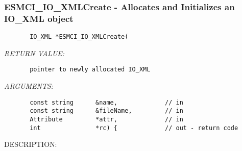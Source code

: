  
\setlength{\oldparskip}{\parskip}
\setlength{\parskip}{1.5ex}
\setlength{\oldparindent}{\parindent}
\setlength{\parindent}{0pt}
\setlength{\oldbaselineskip}{\baselineskip}
\setlength{\baselineskip}{11pt}
 
\def\bv{\begin{verbatim}}
\def\ev{\end{verbatim}}
\def\be{\begin{equation}}
\def\ee{\end{equation}}
\def\bea{\begin{eqnarray}}
\def\eea{\end{eqnarray}}
\def\bi{\begin{itemize}}
\def\ei{\end{itemize}}
\def\bn{\begin{enumerate}}
\def\en{\end{enumerate}}
\def\bd{\begin{description}}
\def\ed{\end{description}}
\def\({\left (}
\def\){\right )}
\def\[{\left [}
\def\]{\right ]}
\def\<{\left  \langle}
\def\>{\right \rangle}
\def\cI{{\cal I}}
\def\diag{\mathop{\rm diag}}
\def\tr{\mathop{\rm tr}}


 
\subsubsection [ESMCI\_IO\_XMLCreate] {ESMCI\_IO\_XMLCreate - Allocates and Initializes an IO\_XML object}


  
\begin{verbatim}       IO_XML *ESMCI_IO_XMLCreate(\end{verbatim}{\em RETURN VALUE:}
\begin{verbatim}       pointer to newly allocated IO_XML\end{verbatim}{\em ARGUMENTS:}
\begin{verbatim}       const string      &name,             // in
       const string      &fileName,         // in
       Attribute         *attr,             // in
       int               *rc) {             // out - return code
 \end{verbatim}
{\sf DESCRIPTION:\\ }


